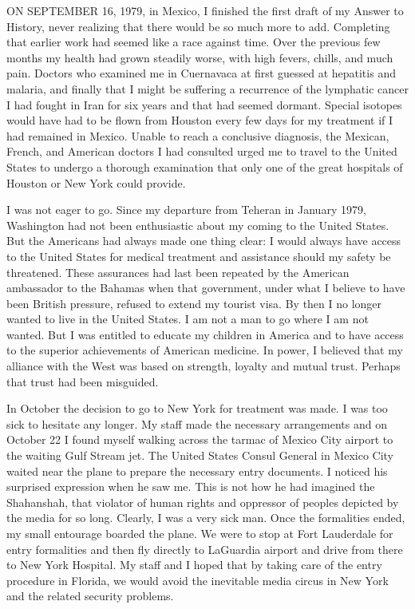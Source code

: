 ON SEPTEMBER 16, 1979, in Mexico, I finished the first draft of my Answer to History, never realizing that there would be so much more to add. Completing that earlier work had seemed like a race against time. Over the previous few months my health had grown steadily worse, with high fevers, chills, and much pain. Doctors who examined me in Cuernavaca at first guessed at hepatitis and malaria, and finally that I might be suffering a recurrence of the lymphatic cancer I had fought in Iran for six years and that had seemed dormant. Special isotopes would have had to be flown from Houston every few days for my treatment if I had remained in Mexico. Unable to reach a conclusive diagnosis, the Mexican, French, and American doctors I had consulted urged me to travel to the United States to undergo a thorough examination that only one of the great hospitals of Houston or New York could provide. 

I was not eager to go. Since my departure from Teheran in January 1979, Washington had not been enthusiastic about my coming to the United States. But the Americans had always made one thing clear: I would always have access to the United States for medical treatment and assistance should my safety be threatened. These assurances had last been repeated by the American ambassador to the Bahamas when that government, under what I believe to have been British pressure, refused to extend my tourist visa. By then I no longer wanted to live in the United States. I am not a man to go where I am not wanted. But I was entitled to educate my children in America and to have access to the superior achievements of American medicine. In power, I believed that my alliance with the West was based on strength, loyalty and mutual trust. Perhaps that trust had been misguided. 

In October the decision to go to New York for treatment was made. I was too sick to hesitate any longer. My staff made the necessary arrangements and on October 22 I found myself walking across the tarmac of Mexico City airport to the waiting Gulf Stream jet. The United States Consul General in Mexico City waited near the plane to prepare the necessary entry documents. I noticed his surprised expression when he saw me. This is not how he had imagined the Shahanshah, that violator of human rights and oppressor of peoples depicted by the media for so long. Clearly, I was a very sick man. Once the formalities ended, my small entourage boarded the plane. We were to stop at Fort Lauderdale for entry formalities and then fly directly to LaGuardia airport and drive from there to New York Hospital. My staff and I hoped that by taking care of the entry procedure in Florida, we would avoid the inevitable media circus in New York and the related security problems. 

